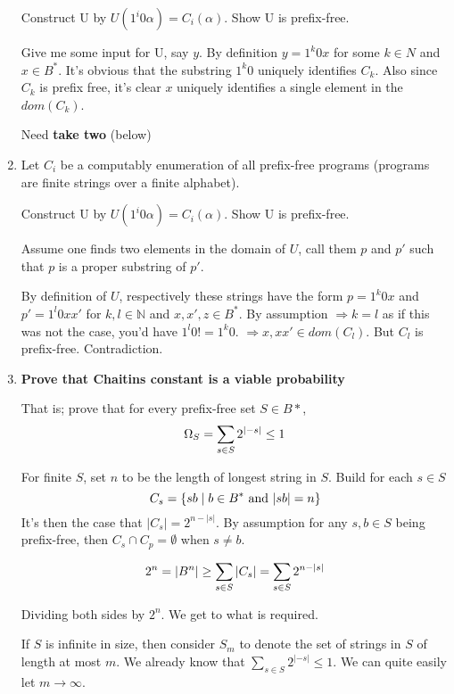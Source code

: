 \documentclass{article}
\newenvironment{answered}{\par\normalfont}{}
\begin{document}
\begin{enumerate}
	Construct U by $U(1^i0\alpha) = C_i(\alpha)$. Show U is prefix-free.

	\begin{answered}
		Give me some input for U, say $y$. By definition $y = 1^k0x$ for some $k \in N$ and $x \in B^*$. It's obvious that the substring $1^k0$ uniquely identifies $C_k$. Also since $C_k$ is prefix free, it's clear $x$ uniquely identifies a single element in the $dom(C_k)$.
	\end{answered}

	Need \textbf{take two} (below)

\item{Let $C_i$ be a computably enumeration of all prefix-free programs (programs are finite strings over a finite alphabet).}
	
	Construct U by $U(1^i0\alpha) = C_i(\alpha)$. Show U is prefix-free.

	\begin{answered}
		Assume one finds two elements in the domain of $U$, call them $p$ and $p'$ such that $p$ is a proper substring of $p'$.

		By definition of $U$, respectively these strings have the form $p = 1^k0x$ and $p' = 1^l0xx'$ for $k,l \in \mathbb{N}$ and $x,x',z \in B^*$. By assumption $\Rightarrow k = l$ as if this was not the case, you'd have $1^l0 != 1^k0$. $\Rightarrow x, xx' \in dom(C_{l})$. But $C_{l}$ is prefix-free. Contradiction.
	\end{answered}

\item{\textbf{Prove that Chaitins constant is a viable probability}}

	\begin{answered}
		That is; prove that for every prefix-free set $S \in B*$,
		\begin{equation}
			\Omega_S=\sum_{s \in S} 2^{|-s|} \leq 1 \notag \\
		\end{equation}

		For finite $S$, set $n$ to be the length of longest string in $S$. Build for each $s\in S$
		\begin{equation}
			C_{s} = \{sb \mid b \in B^* \text{ and } |sb| = n\} \notag \\
		\end{equation}
		It's then the case that $|C_{s}| = 2^{n-|s|}$. By assumption for any $s,b \in S$ being prefix-free, then $C_s \cap C_p = \emptyset$ when $s \not = b$.

		\begin{equation}
			2^n = |B^n| \geq \sum_{s \in S} |C_s| = \sum_{s \in S} 2^{n - |s|} \notag
		\end{equation}

		Dividing both sides by $2^n$. We get to what is required.

    If $S$ is infinite in size, then consider $S_m$ to denote the set of strings in $S$ of length at most $m$. We already know that $\sum_{s \in S} 2^{|-s|} \leq 1$. We can quite easily let $m \rightarrow \infty$.
	\end{answered}

\end{enumerate}
\end{document}
